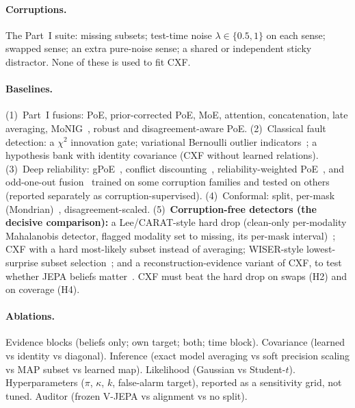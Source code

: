 \documentclass[10pt,twocolumn]{article}
\begin{document}
\paragraph{Corruptions.} The Part~I suite: missing subsets; test-time noise $\lambda\in\{0.5,1\}$ on each sense; swapped
sense; an extra pure-noise sense; a shared or independent sticky distractor. None of these is used to fit CXF.

\paragraph{Baselines.}
(1)~Part~I fusions: PoE, prior-corrected PoE, MoE, attention, concatenation, late averaging, MoNIG~\cite{ma2021monig},
robust and disagreement-aware PoE.
(2)~Classical fault detection: a $\chi^2$ innovation gate; variational Bernoulli outlier indicators~\cite{wang2022outlier};
a hypothesis bank with identity covariance (CXF without learned relations).
(3)~Deep reliability: gPoE~\cite{cao2014gpoe}, conflict discounting~\cite{bezirganyan2025discounted}, reliability-weighted
PoE~\cite{palo2026reliability}, and odd-one-out fusion~\cite{yang2021defending} trained on some corruption families and
tested on others (reported separately as corruption-supervised).
(4)~Conformal: split, per-mask (Mondrian)~\cite{azizi2026conformal}, disagreement-scaled.
(5)~\textbf{Corruption-free detectors (the decisive comparison):} a Lee/CARAT-style hard drop (clean-only per-modality
Mahalanobis detector, flagged modality set to missing, its per-mask interval)~\cite{lee2020detect,mohapatra2026carat};
CXF with a hard most-likely subset instead of averaging; WISER-style lowest-surprise subset
selection~\cite{zollicoffer2025wiser}; and a reconstruction-evidence variant of CXF, to test whether JEPA beliefs
matter~\cite{jensen2026fault}. CXF must beat the hard drop on swaps (H2) and on coverage (H4).



\paragraph{Ablations.} Evidence blocks (beliefs only; own target; both; time block). Covariance (learned vs identity
vs diagonal). Inference (exact model averaging vs soft precision scaling vs MAP subset vs learned map). Likelihood
(Gaussian vs Student-$t$). Hyperparameters ($\pi$, $\kappa$, $k$, false-alarm target), reported as a sensitivity grid,
not tuned. Auditor (frozen V-JEPA vs alignment vs no split).
\end{document}
